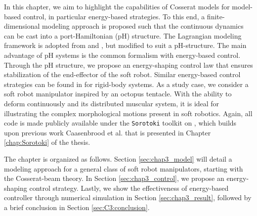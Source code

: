 In this chapter, we aim to highlight the capabilities of Cosserat models for model-based control, in particular energy-based strategies. To this end, a finite-dimensional modeling approach is proposed such that the continuous dynamics can be cast into a port-Hamiltonian (pH) structure. The Lagrangian modeling framework is adopted from \cite{Boyer2021} and \cite{Renda2020}, but modified to suit a pH-structure. The main advantage of pH systems is the common formalism with energy-based control. Through the pH structure, we propose an energy-shaping control law that ensures stabilization of the end-effector of the soft robot. Similar energy-based control strategies can be found in \cite{Franco2020,Schaft2004,Ortega2002,Ortega1998} for rigid-body systems. As a study case, we consider a soft robot manipulator inspired by an octopus tentacle. With the ability to deform continuously and its distributed muscular system, it is ideal for illustrating the complex morphological motions present in soft robotics. Again, all code is made publicly available under the \texttt{Sorotoki} toolkit on \cite{SorotokiCode}, which builds upon previous work Caasenbrood et al. \cite{Caasenbrood2021} that is presented in Chapter \ref{chap:Sorotoki} of the thesis. 

The chapter is organized as follows. Section \ref{sec:chap3_model} will detail a modeling approach for a general class of soft robot manipulators, starting with the Cosserat-beam theory. In Section \ref{sec:chap3_control}, we propose an energy-shaping control strategy. Lastly, we show the effectiveness of energy-based controller through numerical simulation in Section  \ref{sec:chap3_result}, followed by a brief conclusion in Section \ref{sec:C3:conclusion}.
